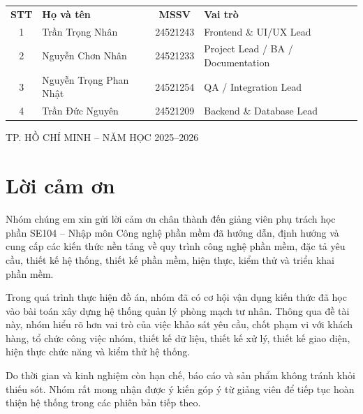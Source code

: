 \documentclass[12pt,a4paper,oneside]{report}
\newcommand{\coursename}{SE104 -- Nhập môn Công nghệ phần mềm}
\begin{document}
\begin{titlepage}
    \vspace{0.75cm}

    \begin{tabularx}{0.84\textwidth}{@{}c X c X@{}}
        \textbf{STT} & \textbf{Họ và tên} & \textbf{MSSV} & \textbf{Vai trò} \\[0.2cm]

        1 & Trần Trọng Nhân & 24521243 & Frontend \& UI/UX Lead \\[0.18cm]

        2 & Nguyễn Chơn Nhân & 24521233 & Project Lead / BA / Documentation \\[0.18cm]

        3 & Nguyễn Trọng Phan Nhật & 24521254 & QA / Integration Lead \\[0.18cm]

        4 & Trần Đức Nguyên & 24521209 & Backend \& Database Lead \\
    \end{tabularx}

    \vfill

    {\normalsize TP. HỒ CHÍ MINH -- NĂM HỌC 2025--2026}

\end{titlepage}

\cleardoublepage


\cleardoublepage %

\chapter*{Lời cảm ơn}
Nhóm chúng em xin gửi lời cảm ơn chân thành đến giảng viên phụ trách học phần \coursename{} đã hướng dẫn, định hướng và cung cấp các kiến thức nền tảng về quy trình công nghệ phần mềm, đặc tả yêu cầu, thiết kế hệ thống, thiết kế phần mềm, hiện thực, kiểm thử và triển khai phần mềm.

Trong quá trình thực hiện đồ án, nhóm đã có cơ hội vận dụng kiến thức đã học vào bài toán xây dựng hệ thống quản lý phòng mạch tư nhân. Thông qua đề tài này, nhóm hiểu rõ hơn vai trò của việc khảo sát yêu cầu, chốt phạm vi với khách hàng, tổ chức công việc nhóm, thiết kế dữ liệu, thiết kế xử lý, thiết kế giao diện, hiện thực chức năng và kiểm thử hệ thống.

Do thời gian và kinh nghiệm còn hạn chế, báo cáo và sản phẩm không tránh khỏi thiếu sót. Nhóm rất mong nhận được ý kiến góp ý từ giảng viên để tiếp tục hoàn thiện hệ thống trong các phiên bản tiếp theo.



\tableofcontents
\listoffigures
\listoftables
\clearpage
{}










\nocite{*}



\appendix

\end{document}
